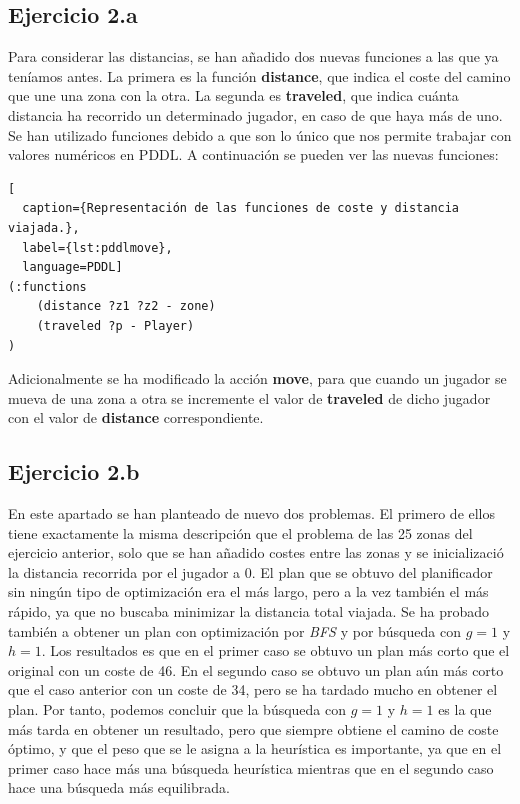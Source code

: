 \documentclass[11pt,a4paper]{article}
\begin{document}
\subsection{Ejercicio 2.a}

Para considerar las distancias, se han añadido dos nuevas funciones a las que ya teníamos antes. La primera es la función
\textbf{distance}, que indica el coste del camino que une una zona con la otra. La segunda es \textbf{traveled}, que indica
cuánta distancia ha recorrido un determinado jugador, en caso de que haya más de uno. Se han utilizado funciones debido a que
son lo único que nos permite trabajar con valores numéricos en PDDL. A continuación se pueden ver las nuevas funciones:

\begin{algorithm}[H]
\begin{lstlisting}[
  caption={Representación de las funciones de coste y distancia viajada.},
  label={lst:pddlmove},
  language=PDDL]
(:functions
    (distance ?z1 ?z2 - zone)
    (traveled ?p - Player)
)
\end{lstlisting}
\end{algorithm}

Adicionalmente se ha modificado la acción \textbf{move}, para que cuando un jugador se mueva de una zona a otra se incremente el
valor de \textbf{traveled} de dicho jugador con el valor de \textbf{distance} correspondiente.

\subsection{Ejercicio 2.b}

En este apartado se han planteado de nuevo dos problemas. El primero de ellos tiene exactamente la misma descripción que el problema
de las 25 zonas del ejercicio anterior, solo que se han añadido costes entre las zonas y se inicializació la distancia recorrida
por el jugador a 0. El plan que se obtuvo del planificador sin ningún tipo de optimización
era el más largo, pero a la vez también el más rápido, ya que no buscaba minimizar la distancia total viajada. Se ha probado también a
obtener un plan con optimización por \textit{BFS} y por búsqueda con $g = 1$ y $h = 1$. Los resultados es que en el primer caso se
obtuvo un plan más corto que el original con un coste de 46. En el segundo caso se obtuvo un plan aún más corto que el caso anterior
con un coste de 34, pero se ha tardado mucho en obtener el plan. Por tanto, podemos concluir que la búsqueda con $g = 1$ y $h = 1$ es
la que más tarda en obtener un resultado, pero que siempre obtiene el camino de coste óptimo, y que el peso que se le asigna a la
heurística es importante, ya que en el primer caso hace más una búsqueda heurística mientras que en el segundo caso hace una búsqueda
más equilibrada.
\end{document}
